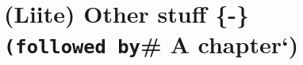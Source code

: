 \documentclass[
  12pt,
  a4paper, twoside]{book}
\begin{document}

\hypertarget{liite-other-stuff--followed-by-a-chapter}{%
\chapter{\texorpdfstring{(Liite) Other stuff \{-\}\texttt{(followed\ by}\# A chapter`)}{(Liite) Other stuff \{-\}(followed by\# A chapter`)}}\label{liite-other-stuff--followed-by-a-chapter}}

  
\end{document}

